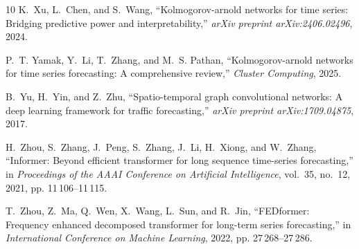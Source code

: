 \documentclass[lettersize,journal]{IEEEtran}
\begin{document}
\begin{thebibliography}{10}
K.~Xu, L.~Chen, and S.~Wang, ``Kolmogorov-arnold networks for time series: Bridging predictive power and interpretability,'' \emph{arXiv preprint arXiv:2406.02496}, 2024.

P.~T. Yamak, Y.~Li, T.~Zhang, and M.~S. Pathan, ``Kolmogorov-arnold networks for time series forecasting: A comprehensive review,'' \emph{Cluster Computing}, 2025.

B.~Yu, H.~Yin, and Z.~Zhu, ``Spatio-temporal graph convolutional networks: A deep learning framework for traffic forecasting,'' \emph{arXiv preprint arXiv:1709.04875}, 2017.

H.~Zhou, S.~Zhang, J.~Peng, S.~Zhang, J.~Li, H.~Xiong, and W.~Zhang, ``{Informer}: Beyond efficient transformer for long sequence time-series forecasting,'' in \emph{Proceedings of the AAAI Conference on Artificial Intelligence}, vol.~35, no.~12, 2021, pp. 11\,106--11\,115.

T.~Zhou, Z.~Ma, Q.~Wen, X.~Wang, L.~Sun, and R.~Jin, ``{FEDformer}: Frequency enhanced decomposed transformer for long-term series forecasting,'' in \emph{International Conference on Machine Learning}, 2022, pp. 27\,268--27\,286.

\end{thebibliography}
\end{document}
